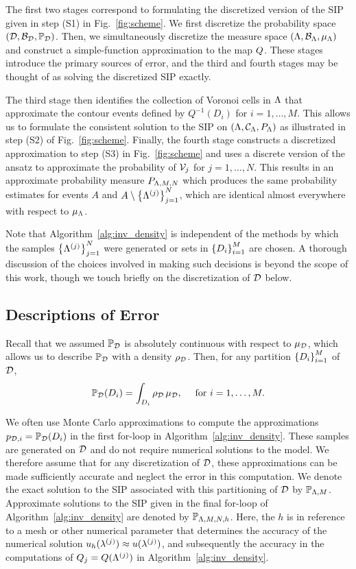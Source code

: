 The first two stages correspond to formulating the discretized version of the SIP given in step (S1) in Fig.~\ref{fig:scheme}. 
We first discretize the probability space $(\mathcal{D}, \mathcal{B}_{\mathcal{D}}, \mathbb{P}_{\mathcal{D}})$.
Then, we simultaneously discretize the measure space $({\Lambda}, \mathcal{B}_{{\Lambda}}, \mu_{{\Lambda}})$ and construct a simple-function approximation to the map $Q$.
These stages introduce the primary sources of error, and the third and fourth stages may be thought of as solving the discretized SIP exactly.

The third stage then identifies the collection of Voronoi cells in ${\Lambda}$ that approximate the contour events defined by $Q^{-1}(D_i)$ for $i=1,\hdots,M$. This allows us to formulate the consistent solution to the SIP on $({\Lambda}, \mathcal{C}_{\Lambda}, P_{\Lambda})$ as illustrated in step (S2) of Fig.~\ref{fig:scheme}. 
Finally, the fourth stage constructs a discretized approximation to step (S3) in Fig.~\ref{fig:scheme} and uses a discrete version of the ansatz to approximate the probability of $\mathcal{V}_j$ for $j=1,\dots,N$. 
This results in an approximate probability measure $P_{{\Lambda}, M, N}$ which produces the same probability estimates for events $A$ and $A\setminus \left\{ {\Lambda}^{(j)} \right\}_{j=1}^{N}$, which are identical almost everywhere with respect to $\mu_{{\Lambda}}$. 

Note that Algorithm~\ref{alg:inv_density} is independent of the methods by which the samples $\left\{ {\Lambda}^{(j)} \right\}_{j=1}^{N}$ were generated or sets in $\left\{D_i\right\}_{i=1}^{M}$ are chosen.  
A thorough discussion of the choices involved in making such decisions is beyond the scope of this work, though we touch briefly on the discretization of $\mathcal{D}$ below. 



\subsection{Descriptions of Error}\label{sec:error}
Recall that we assumed $\mathbb{P}_{\mathcal{D}}$ is absolutely continuous with respect to $\mu_{\mathcal{D}}$, which allows us to describe $\mathbb{P}_{\mathcal{D}}$ with a density $\rho_{\mathcal{D}}$. Then, for any partition $\left\{D_i\right\}_{i=1}^{M}$ of $\mathcal{D}$, 
\[
\mathbb{P}_{\mathcal{D}} (D_i) = \int_{D_i} \rho_{\mathcal{D}} \, \mu_{\mathcal{D}}, \quad \text{ for } i = 1, \hdots, M.
\]

We often use Monte Carlo approximations to compute the approximations $p_{\mathcal{D}, i}=\mathbb{P}_{\mathcal{D}}(D_i)$ in the first for-loop in Algorithm~\ref{alg:inv_density}. 
These samples are generated on $\mathcal{D}$ and do not require numerical solutions to the model. 
We therefore assume that for any discretization of $\mathcal{D}$, these approximations can be made sufficiently accurate and neglect the error in this computation. 
We denote the exact solution to the SIP associated with this partitioning of $\mathcal{D}$ by $\mathbb{P}_{{\Lambda}, M}$. 
Approximate solutions to the SIP given in the final for-loop of Algorithm~\ref{alg:inv_density} are denoted by $\mathbb{P}_{{\Lambda}, M, N, h}$.
Here, the $h$ is in reference to a mesh or other numerical parameter that determines the accuracy of the numerical solution $u_h(\lambda^{(j)})\approx u(\lambda^{(j)})$, and subsequently the accuracy in the computations of $Q_j = Q({\Lambda}^{(j)})$ in Algorithm~\ref{alg:inv_density}.
 
